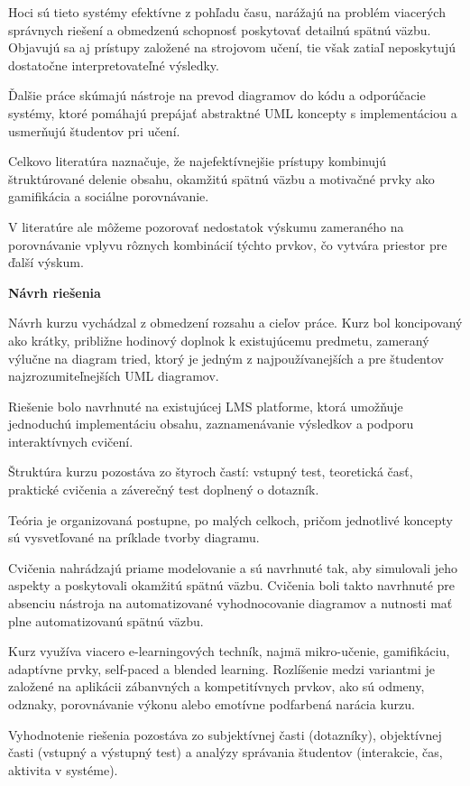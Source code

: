 Hoci sú tieto systémy efektívne z pohľadu času, narážajú na problém viacerých správnych riešení a obmedzenú schopnosť poskytovať detailnú spätnú väzbu. Objavujú sa aj prístupy založené na strojovom učení, tie však zatiaľ neposkytujú dostatočne interpretovateľné výsledky.

Ďalšie práce skúmajú nástroje na prevod diagramov do kódu a odporúčacie systémy, ktoré pomáhajú prepájať abstraktné UML koncepty s implementáciou a usmerňujú študentov pri učení.

Celkovo literatúra naznačuje, že najefektívnejšie prístupy kombinujú štruktúrované delenie obsahu, okamžitú spätnú väzbu a motivačné prvky ako gamifikácia a sociálne porovnávanie. 

V literatúre ale môžeme pozorovať nedostatok výskumu zameraného na porovnávanie vplyvu rôznych kombinácií týchto prvkov, čo vytvára priestor pre ďalší výskum.


\textbf{Návrh riešenia}

Návrh kurzu vychádzal z obmedzení rozsahu a cieľov práce. Kurz bol koncipovaný ako krátky, približne hodinový doplnok k existujúcemu predmetu, zameraný výlučne na diagram tried, ktorý je jedným z najpoužívanejších a pre študentov najzrozumiteľnejších UML diagramov.

Riešenie bolo navrhnuté na existujúcej LMS platforme, ktorá umožňuje jednoduchú implementáciu obsahu, zaznamenávanie výsledkov a podporu interaktívnych cvičení.

Štruktúra kurzu pozostáva zo štyroch častí: vstupný test, teoretická časť, praktické cvičenia a záverečný test doplnený o dotazník. 

Teória je organizovaná postupne, po malých celkoch, pričom jednotlivé koncepty sú vysvetľované na príklade tvorby diagramu. 

Cvičenia nahrádzajú priame modelovanie a sú navrhnuté tak, aby simulovali jeho aspekty a poskytovali okamžitú spätnú väzbu. Cvičenia boli takto navrhnuté pre absenciu nástroja na automatizované vyhodnocovanie diagramov a nutnosti mať plne automatizovanú spätnú väzbu.

Kurz využíva viacero e-learningových techník, najmä mikro-učenie, gamifikáciu, adaptívne prvky, self-paced a blended learning. Rozlíšenie medzi variantmi je založené na aplikácii zábanvných a kompetitívnych prvkov, ako sú odmeny, odznaky, porovnávanie výkonu alebo emotívne podfarbená narácia kurzu.

Vyhodnotenie riešenia pozostáva zo subjektívnej časti (dotazníky), objektívnej časti (vstupný a výstupný test) a analýzy správania študentov (interakcie, čas, aktivita v systéme).


